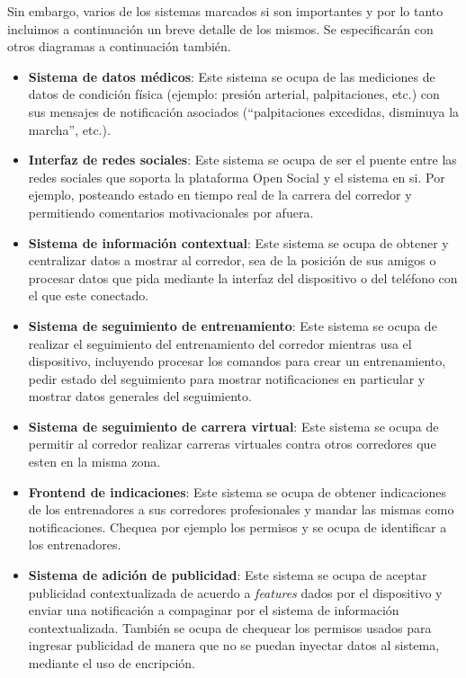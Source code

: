 Sin embargo, varios de los sistemas marcados si son importantes y por lo
tanto incluimos a continuación un breve detalle de los mismos. Se 
especificarán con otros diagramas a continuación también.

\begin{itemize}
	\item \textbf{Sistema de datos médicos}: Este sistema se ocupa de
	las mediciones de datos de condición física (ejemplo: presión
	arterial, palpitaciones, etc.) con sus mensajes de notificación
	asociados (``palpitaciones excedidas, disminuya la marcha'', etc.).
	\item \textbf{Interfaz de redes sociales}: Este sistema se ocupa
	de ser el puente entre las redes sociales que soporta la plataforma
	Open Social y el sistema en si. Por ejemplo, posteando estado en
	tiempo real de la carrera del corredor y permitiendo comentarios
	motivacionales por afuera.
	\item \textbf{Sistema de información contextual}: Este sistema se ocupa
	de obtener y centralizar datos a mostrar al corredor, sea de la 
	posición de sus amigos o procesar datos que pida mediante la
	interfaz del dispositivo o del teléfono con el que este conectado.
	\item \textbf{Sistema de seguimiento de entrenamiento}: Este sistema se
	ocupa de realizar el seguimiento del entrenamiento del corredor
	mientras usa el dispositivo, incluyendo procesar los comandos para crear
	un entrenamiento, pedir estado del seguimiento para mostrar 
	notificaciones en particular y mostrar datos generales del seguimiento.	
	\item \textbf{Sistema de seguimiento de carrera virtual}: Este sistema
	se ocupa de permitir al corredor realizar carreras virtuales contra 
	otros corredores que esten en la misma zona.
	\item \textbf{Frontend de indicaciones}: Este sistema se ocupa de
	obtener indicaciones de los entrenadores a sus corredores profesionales
	y mandar las mismas como notificaciones. Chequea por ejemplo los permisos
	y se ocupa de identificar a los entrenadores.
	\item \textbf{Sistema de adición de publicidad}: Este sistema se ocupa de 
	aceptar publicidad contextualizada de acuerdo a \textit{features} dados
	por el dispositivo y enviar una notificación a compaginar por el sistema 
	de información contextualizada. También se ocupa de chequear los permisos
	usados para ingresar publicidad de manera que no se puedan inyectar 
	datos al sistema,  mediante el uso de encripción.
\end{itemize}

